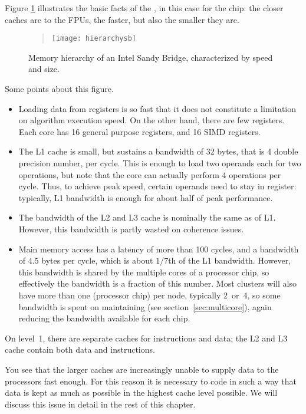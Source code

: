 Figure \ref{fig:hierarchy} illustrates the basic facts of the
, in
this case for the  chip: the
closer caches are to the \acp{FPU}, the faster, but also the
smaller they are.
\begin{figure}[ht]
  \begin{quote}
  \texttt{[image: hierarchysb]}
  \end{quote}
  \caption{Memory hierarchy of an Intel Sandy Bridge, characterized by speed and size.}
  \label{fig:hierarchy}
\end{figure}
Some points about this figure.
\begin{itemize}
\item Loading data from registers is so fast that it does not
  constitute a limitation on algorithm execution speed. On the other
  hand, there are few registers. Each core has 16 general purpose
  registers, and 16 SIMD registers.
\item The L1 cache is small, but sustains a bandwidth of 32 bytes,
  that is 4 double precision number, per cycle. This is enough to load
  two operands each for two operations, but note that the core can
  actually perform 4 operations per cycle. Thus, to achieve peak
  speed, certain operands need to stay in register: typically, L1 
  bandwidth is enough for about half of peak performance.
\item The bandwidth of the L2 and L3 cache is nominally the same as
  of L1. However, this bandwidth is partly wasted on coherence issues.
\item Main memory access has a latency of more than 100 cycles, and a
  bandwidth of 4.5 bytes per cycle, which is about $1/7$th of the L1
  bandwidth. However, this bandwidth is shared by the multiple cores
  of a processor chip, so effectively the bandwidth is a fraction of
  this number. Most clusters will also have more than one
   (processor chip) per node, typically 2~or~4, so
  some bandwidth is spent on maintaining
   (see section~\ref{sec:multicore}),
  again reducing the bandwidth available for each chip.
\end{itemize}

On level~1, there are separate caches for instructions and data; the
L2 and L3 cache contain both data and instructions.

You see that the larger caches are increasingly unable to supply data
to the processors fast enough. For this reason it is necessary to code
in such a way that data is kept as much as possible in the highest
cache level possible. We will discuss this issue in detail in the rest
of this chapter.

